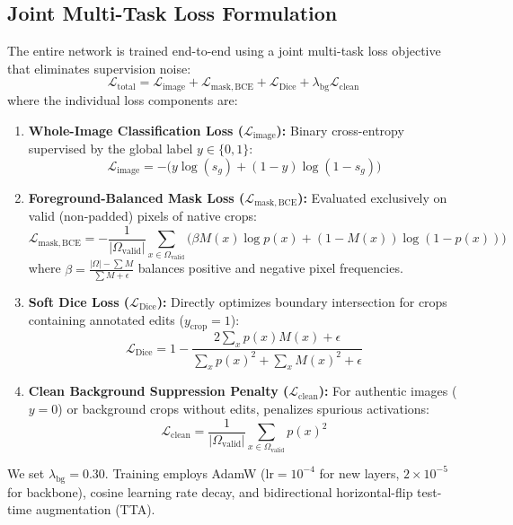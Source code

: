 \documentclass[sigconf,review=true]{acmart}
\begin{document}
\subsection{Joint Multi-Task Loss Formulation}
The entire network is trained end-to-end using a joint multi-task loss objective that eliminates supervision noise:
\begin{equation}
    \mathcal{L}_{\mathrm{total}} = \mathcal{L}_{\mathrm{image}} + \mathcal{L}_{\mathrm{mask,BCE}} + \mathcal{L}_{\mathrm{Dice}} + \lambda_{\mathrm{bg}} \mathcal{L}_{\mathrm{clean}}
    \label{eq:total_loss}
\end{equation}
where the individual loss components are:
\begin{enumerate}
    \item \textbf{Whole-Image Classification Loss ($\mathcal{L}_{\mathrm{image}}$):} Binary cross-entropy supervised by the global label $y \in \{0, 1\}$:
    \begin{equation}
        \mathcal{L}_{\mathrm{image}} = -\Big(y \log(s_g) + (1 - y) \log(1 - s_g)\Big)
    \end{equation}
    \item \textbf{Foreground-Balanced Mask Loss ($\mathcal{L}_{\mathrm{mask,BCE}}$):} Evaluated exclusively on valid (non-padded) pixels of native crops:
    \begin{equation}
        \mathcal{L}_{\mathrm{mask,BCE}} = -\frac{1}{|\Omega_{\mathrm{valid}}|} \sum_{x \in \Omega_{\mathrm{valid}}} \Big(\beta M(x) \log p(x) + (1 - M(x)) \log(1 - p(x))\Big)
    \end{equation}
    where $\beta = \frac{|\Omega| - \sum M}{\sum M + \epsilon}$ balances positive and negative pixel frequencies.
    \item \textbf{Soft Dice Loss ($\mathcal{L}_{\mathrm{Dice}}$):} Directly optimizes boundary intersection for crops containing annotated edits ($y_{\mathrm{crop}} = 1$):
    \begin{equation}
        \mathcal{L}_{\mathrm{Dice}} = 1 - \frac{2 \sum_{x} p(x) M(x) + \epsilon}{\sum_x p(x)^2 + \sum_x M(x)^2 + \epsilon}
    \end{equation}
    \item \textbf{Clean Background Suppression Penalty ($\mathcal{L}_{\mathrm{clean}}$):} For authentic images ($y = 0$) or background crops without edits, penalizes spurious activations:
    \begin{equation}
        \mathcal{L}_{\mathrm{clean}} = \frac{1}{|\Omega_{\mathrm{valid}}|} \sum_{x \in \Omega_{\mathrm{valid}}} p(x)^2
    \end{equation}
\end{enumerate}
We set $\lambda_{\mathrm{bg}} = 0.30$. Training employs AdamW ($\mathrm{lr} = 10^{-4}$ for new layers, $2 \times 10^{-5}$ for backbone), cosine learning rate decay, and bidirectional horizontal-flip test-time augmentation (TTA).
\end{document}
